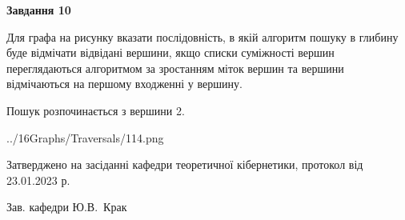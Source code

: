 \documentclass[12pt, ukrainian]{article}
\begin{document}
{\begin {large}
{\begin {center}\textbf{Завдання 10}\end {center}}\par
Для графа на рисунку вказати послідовність, в якій алгоритм пошуку в глибину буде відмічати відвідані вершини, якщо списки суміжності вершин переглядаються алгоритмом за зростанням міток вершин та вершини відмічаються на першому вход\-женні у вершину.\par
Пошук розпочинається з вершини 2.\par

\begin{center}
	{../16Graphs/Traversals/114.png}
\end{center}\par
\newpage


\end {large}
}
{\smallskip \begin {small} Затверджено на засіданні кафедри теоретичної кібернетики, протокол  від   23.01.2023 р.\par\smallskip\smallskip
{\parbox {6.5 cm}{Зав. кафедри \dotfill Ю.В.~Крак}} \end{small}}
\end{document}
